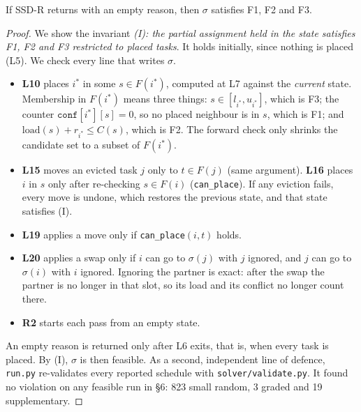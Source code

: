 \begin{theorem}[Soundness]\label{thm:sound}
If SSD-R returns with an empty reason, then $\sigma$ satisfies F1, F2 and F3.
\end{theorem}
\begin{proof}
We show the invariant \emph{(I): the partial assignment held in the state
satisfies F1, F2 and F3 restricted to placed tasks}. It holds initially,
since nothing is placed (L5). We check every line that writes $\sigma$.
\begin{itemize}
\item \textbf{L10} places $i^\ast$ in some $s\in F(i^\ast)$, computed at L7
  against the \emph{current} state. Membership in $F(i^\ast)$ means three
  things: $s\in[l_{i^\ast},u_{i^\ast}]$, which is F3; the counter
  $\texttt{conf}[i^\ast][s]=0$, so no placed neighbour is in $s$, which is
  F1; and $\text{load}(s)+r_{i^\ast}\le C(s)$, which is F2. The forward
  check only shrinks the candidate set to a subset of $F(i^\ast)$.
\item \textbf{L15} moves an evicted task $j$ only to $t\in F(j)$ (same
  argument). \textbf{L16} places $i$ in $s$ only after re-checking
  $s\in F(i)$ (\texttt{can\_place}). If any eviction fails, every move is
  undone, which restores the previous state, and that state satisfies (I).
\item \textbf{L19} applies a move only if \texttt{can\_place}$(i,t)$ holds.
\item \textbf{L20} applies a swap only if $i$ can go to $\sigma(j)$ with $j$
  ignored, and $j$ can go to $\sigma(i)$ with $i$ ignored. Ignoring the
  partner is exact: after the swap the partner is no longer in that slot,
  so its load and its conflict no longer count there.
\item \textbf{R2} starts each pass from an empty state.
\end{itemize}
An empty reason is returned only after L6 exits, that is, when every task
is placed. By (I), $\sigma$ is then feasible. As a second, independent
line of defence, \texttt{run.py} re-validates every reported schedule with
\texttt{solver/validate.py}. It found no violation on any feasible run in
\S6: 823 small random, 3 graded and 19 supplementary.
\end{proof}

